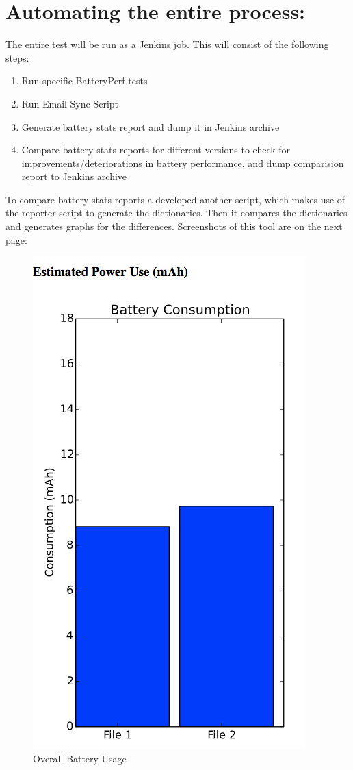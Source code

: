 \section{Automating the entire process:} The entire test will be run as a Jenkins job. This will consist of the following steps:
\begin{enumerate}
	\item Run specific BatteryPerf tests
	\item Run Email Sync Script
	\item Generate battery stats report and dump it in Jenkins archive
	\item Compare battery stats reports for different versions to check for improvements/deteriorations in battery performance, and dump comparision report to Jenkins archive

\end{enumerate}
To compare battery stats reports a developed another script, which makes use of the reporter script to generate the dictionaries. Then it compares the dictionaries and generates graphs for the differences. Screenshots of this tool are on the next page:
\begin{figure}[!h]
 	\begin{center}
		\includegraphics[scale=0.6]{diff1}
		\caption{Overall Battery Usage}
	\end{center}
\end{figure}
